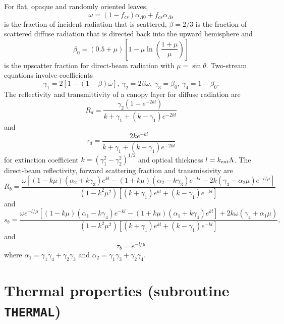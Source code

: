 \documentclass[fleqn]{article}
\begin{document}
For flat, opaque and randomly oriented leaves, 
\begin{equation}
\omega = (1 - f_{cs})\alpha_{\Lambda 0} + f_{cs}\alpha_{\Lambda s}
\end{equation}
is the fraction of incident radiation that is scattered, $\beta = 2/3$ is the fraction of scattered diffuse radiation that is directed back into the upward hemisphere and
\begin{equation}
\beta_0 = (0.5 + \mu)\left[1 - \mu\ln\left(\frac{1 + \mu}{\mu}\right)\right]
\end{equation}
is the upscatter fraction for direct-beam radiation with $\mu = \sin\theta$. Two-stream equations involve coefficients
\begin{equation}
\gamma_1 = 2[1 - (1 - \beta)\omega],\ \gamma_2 = 2\beta\omega,\ \gamma_3 = \beta_0,\ \gamma_4 = 1 - \beta_0.
\end{equation}
The reflectivity and transmittivity of a canopy layer for diffuse radiation are
\begin{equation}
R_d = \frac{\gamma_2(1 - e^{-2kl})}{k + \gamma_1 + (k - \gamma_1)e^{-2kl}}
\label{eq:rdif}
\end{equation}
and
\begin{equation}
\tau_d = \frac{2ke^{-kl}}{k + \gamma_1 + (k - \gamma_1)e^{-2kl}}
\end{equation}
for extinction coefficient $k = (\gamma_1^2 - \gamma_2^2)^{1/2}$ and optical thickness $l = k_{\rm ext}\Lambda$. The direct-beam reflectivity, forward scattering fraction and transmissivity are
\begin{equation}
R_b = \frac
{\omega[(1 - k\mu)(\alpha_2 + k\gamma_3)e^{kl} - (1 + k\mu)(\alpha_2 - k\gamma_3)e^{-kl} - 2k(\gamma_3 - \alpha_2\mu)e^{-l/\mu}]} {(1 - k^2\mu^2)[(k + \gamma_1)e^{kl} + (k - \gamma_1)e^{-kl}]}
\end{equation}
and
\begin{equation}
s_b = \frac{\omega e^{-l/\mu}[(1 - k\mu)(\alpha_1 - k\gamma_4)e^{-kl} - (1 + k\mu)(\alpha_1 + k\gamma_4)e^{kl}] + 2k\omega(\gamma_4 + \alpha_1\mu)}
{(1 - k^2\mu^2)[(k + \gamma_1)e^{kl} + (k - \gamma_1)e^{-kl}]},
\end{equation}
and
\begin{equation}
\tau_b = e^{-l/\mu}
\end{equation}
where $\alpha_1 = \gamma_1\gamma_4 + \gamma_2\gamma_3$ and $\alpha_2 = \gamma_1\gamma_3 + \gamma_2\gamma_4$.

\section{Thermal properties (subroutine {\tt THERMAL})}
\end{document}
